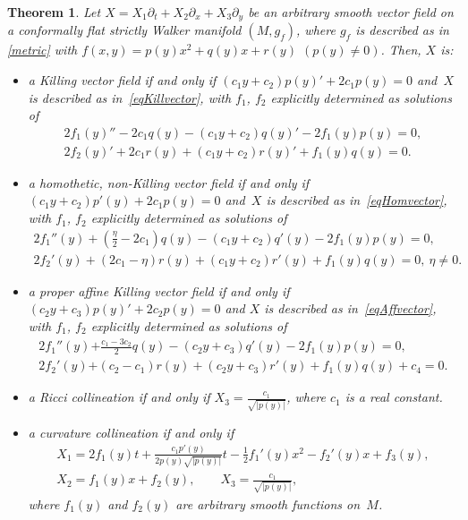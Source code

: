 \documentclass[10pt,a4paper]{amsart}
\numberwithin{equation}{section}
\newtheorem{Theorem}{Theorem}[section]
\begin{document}
\begin{Theorem}\label{cflatW}
Let $X=X_1\partial_t+X_2\partial_x+X_3\partial_y$ be an arbitrary smooth vector field on a conformally flat strictly Walker manifold $(M,g_f)$, where $g_f$ is described as in \eqref{metric} with $f(x,y)=p(y)x^2+q(y)x+r(y)$ $(p(y)\neq 0)$. Then, $X$ is:
\begin{itemize}\itemsep=0pt
\item[$i)$] a Killing vector field if and only if $(c_1y+c_2)p(y)'+2c_1p(y)=0$ and~$X$ is described as in~\eqref{eqKillvector}, with $f_1$, $f_2$ explicitly determined as solutions of
\begin{gather*}
2f_1(y)''-2c_1q(y)-(c_1y+c_2)q(y)'-2f_1(y)p(y)=0,\\
{2f_2(y)'+2c_1r(y)+}(c_1y+c_2)r(y)'+f_1(y)q(y)=0.
\end{gather*}
\item[$ii)$] a homothetic, non-Killing vector field if and only if $(c_1y+c_2)p'(y)+2c_1p(y)=0$ and~$X$ is described as in~\eqref{eqHomvector}, with $f_1$, $f_2$ explicitly determined as solutions of
\begin{gather*}
2f_1 ''(y)+(\frac{\eta}{2}-2c_1)q(y)-(c_1y+c_2)q '(y)-2f_1(y)p(y)=0,\\
{2f_2 '(y)+(2c_1-\eta)r(y)}+(c_1y+c_2)r'(y)+f_1(y)q(y)=0,\ \eta\neq0.
\end{gather*}
\item[$iii)$] a proper affine Killing vector field if and only if $(c_2y+c_3)p(y)'+2c_2p(y)=0$ and $X$ is described as in~\eqref{eqAffvector}, with $f_1$, $f_2$ explicitly determined as solutions of
\begin{gather*}
2f_1 ''(y){+\frac{c_1-3c_2}{2}q(y)}-(c_2y+c_3)q' (y)-2f_1(y)p(y)=0,\\
2f_2 '(y) {+(c_2-c_1)r(y)} +(c_2y+c_3)r '(y)+f_1(y)q(y)+c_4=0.
\end{gather*}
\item[$iv)$] a Ricci collineation if and only if $X_3=\frac{c_1}{\sqrt{|p(y)|}}$, where $c_1$ is a real constant.
\item[$v)$] a curvature collineation if and only if
\begin{gather*}
X_1=2f_1(y)t+\frac{c_1p'(y)}{2p(y)\sqrt{|p(y)|}}t-\frac12f_1 '(y)x^2-f_2 '(y)x+f_3(y),\\
X_2=f_1(y)x+f_2(y),\qquad
X_3=\frac{c_1}{\sqrt{|p(y)|}},
\end{gather*}
where $f_1(y)$ and $f_2(y)$ are arbitrary smooth functions on~$M$.
\end{itemize}
\end{Theorem}
\end{document}
